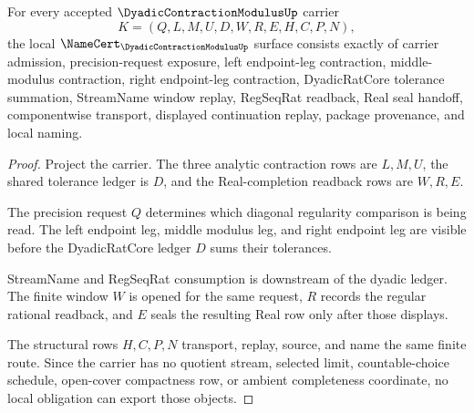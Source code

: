 \begin{theorem}
\label{thm:dyadic-contraction-modulus-namecert-obligations}
For every accepted $\DyadicContractionModulusUp$ carrier
$$
K=(Q,L,M,U,D,W,R,E,H,C,P,N),
$$
the local $\NameCert_{\DyadicContractionModulusUp}$ surface consists exactly of carrier admission, precision-request exposure, left endpoint-leg contraction, middle-modulus contraction, right endpoint-leg contraction, DyadicRatCore tolerance summation, StreamName window replay, RegSeqRat readback, Real seal handoff, componentwise transport, displayed continuation replay, package provenance, and local naming.
\end{theorem}
\begin{proof}
Project the carrier. The three analytic contraction rows are $L,M,U$, the shared tolerance ledger is $D$, and the Real-completion readback rows are $W,R,E$.

The precision request $Q$ determines which diagonal regularity comparison is being read. The left endpoint leg, middle modulus leg, and right endpoint leg are visible before the DyadicRatCore ledger $D$ sums their tolerances.

StreamName and RegSeqRat consumption is downstream of the dyadic ledger. The finite window $W$ is opened for the same request, $R$ records the regular rational readback, and $E$ seals the resulting Real row only after those displays.

The structural rows $H,C,P,N$ transport, replay, source, and name the same finite route. Since the carrier has no quotient stream, selected limit, countable-choice schedule, open-cover compactness row, or ambient completeness coordinate, no local obligation can export those objects.
\end{proof}

